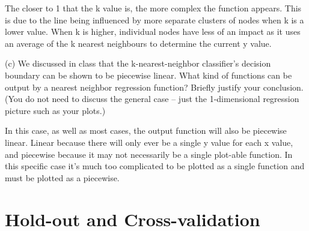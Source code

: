 \documentclass[]{report}   %
\begin{document}
The closer to 1 that the k value is, the more complex the function appears. This is due to the line being influenced by more separate clusters of nodes when k is a lower value. When k is higher, individual nodes have less of an impact as it uses an average of the k nearest neighbours to determine the current y value.
\newline

(c) We discussed in class that the k-nearest-neighbor classifier’s decision boundary can be shown to be piecewise linear. What kind of functions can be output by a nearest neighbor regression function? Briefly justify your conclusion. (You do not need to discuss the general case – just the 1-dimensional regression picture such as your plots.)
\newline

In this case, as well as most cases, the output function will also be piecewise linear. Linear because there will only ever be a single y value for each x value, and piecewise because it may not necessarily be a single plot-able function. In this specific case it's much too complicated to be plotted as a single function and must be plotted as a piecewise.


\section{Hold-out and Cross-validation}
\end{document}
